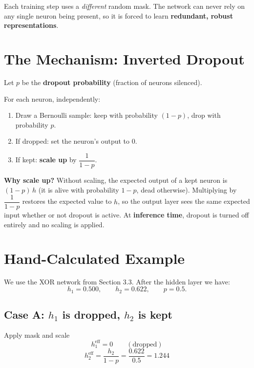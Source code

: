 \documentclass[12pt, a4paper]{article}
\newif\ifstudentmode
\newcommand{\sol}[2][6cm]{%
  \ifstudentmode\underline{\hspace{#1}}\else{#2}\fi}
\theoremstyle{definition}
\begin{document}
Each training step uses a \emph{different} random mask.
The network can never rely on any single neuron being present, so it is
forced to learn \textbf{redundant, robust representations}.

\section{The Mechanism: Inverted Dropout}

Let $p$ be the \textbf{dropout probability} (fraction of neurons silenced).

For each neuron, independently:
\begin{enumerate}[nosep]
  \item Draw a Bernoulli sample: keep with probability $(1-p)$, drop with
        probability $p$.
  \item If dropped: set the neuron's output to $0$.
  \item If kept: \textbf{scale up} by $\dfrac{1}{1-p}$.
\end{enumerate}

\begin{resultbox}
\textbf{Why scale up?}
Without scaling, the expected output of a kept neuron is $(1-p)\,h$
(it is alive with probability $1-p$, dead otherwise).
Multiplying by $\dfrac{1}{1-p}$ restores the expected value to $h$,
so the output layer sees the same expected input whether or not dropout
is active.  At \textbf{inference time}, dropout is turned off entirely
and no scaling is applied.
\end{resultbox}

\section{Hand-Calculated Example}

We use the XOR network from Section 3.3.  After the hidden layer we have:
\[
  h_1 = 0.500, \qquad h_2 = 0.622, \qquad p = 0.5.
\]

\subsection{Case A: $h_1$ is dropped, $h_2$ is kept}

\begin{stepbox}{Apply mask and scale}
\[
  h_1^{\text{eff}} = 0 \qquad (\text{dropped})
\]
\[
  h_2^{\text{eff}} = \frac{h_2}{1-p} = \frac{0.622}{0.5} = \sol[3cm]{1.244}
\]
\end{stepbox}
\end{document}
